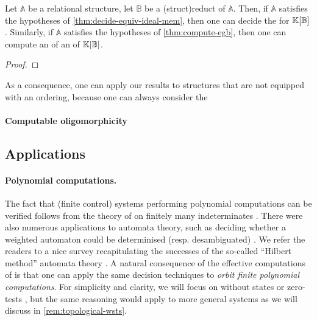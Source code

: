 
\begin{lemma}
  \label{lem:reducts-equiv-hilbert}
  Let $\mathbb{A}$ be a relational structure, let $\mathbb{B}$ be a 
  \kl(struct){reduct} of $\mathbb{A}$. Then, if $\mathbb{A}$ satisfies the
  hypotheses of \cref{thm:decide-equiv-ideal-mem},
  then one can decide the  for
  $\mathbb{K}[\mathbb{B}]$. Similarly, 
  if $\mathbb{A}$ satisfies the hypotheses of
  \cref{thm:compute-egb}, then one can compute an
   of an
   of $\mathbb{K}[\mathbb{B}]$.
\end{lemma}
\begin{proof}
\end{proof}

\AP 
As a consequence, one can apply our results to structures that are not equipped 
with an ordering, because one can always consider the 


\paragraph{Computable oligomorphicity}


\subsection{Applications}


\paragraph{Polynomial computations.} \AP The fact that (finite control) systems
performing polynomial computations can be verified follows from the theory of
 on finitely many indeterminates \cite{MULSEI02,BEDUSHWO17}.
There were also numerous applications to automata theory, such as deciding
whether a weighted automaton could be determinised (resp. desambiguated)
\cite{BESM23,PUSM24}. We refer the readers to a nice survey recapitulating the
successes of the so-called ``Hilbert method'' automata theory \cite{BOJAN19}. A
natural consequence of the effective computations of  is that one can apply the same decision techniques to \emph{orbit finite
polynomial computations}. For simplicity and clarity, we will focus on
 without states or zero-tests \cite{BEDUSHWO17}, but
the same reasoning would apply to more general systems as we will discuss in
\cref{rem:topological-wsts}.



